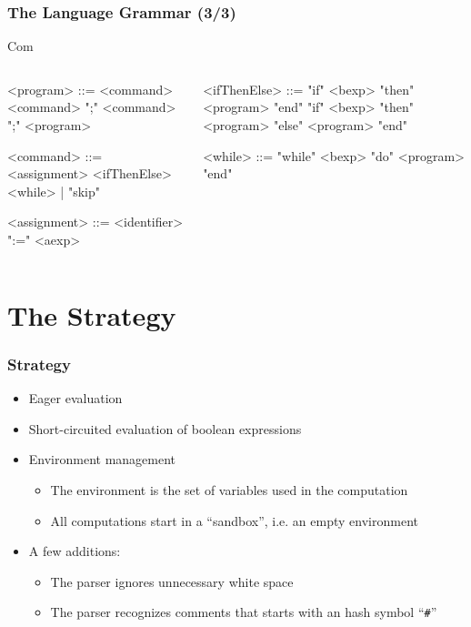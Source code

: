 \documentclass{beamer}
\begin{document}
\begin{frame}[fragile]
\footnotesize
\frametitle{The Language Grammar (3/3)}
\begin{block}{Com}
\begin{columns}
\begin{grammar}
	<program> ::= <command>
	\alt <command> ";"
	\alt <command> ";" <program>

	<command> ::= <assignment>
	\alt <ifThenElse>
	\alt <while> | "skip"

	<assignment> ::= <identifier> ":=" <aexp>

\end{grammar}
\begin{grammar}
	<ifThenElse> ::= "if" <bexp> "then" <program> "end"
	\alt "if" <bexp> "then" <program> "else" <program> "end"

	<while> ::= "while" <bexp> "do" <program> "end"
\end{grammar}
\end{columns}
\end{block}
\end{frame}

\section{The Strategy}
\begin{frame}
\frametitle{Strategy}
\begin{itemize}
	\item Eager evaluation
	\item Short-circuited evaluation of boolean expressions
	\item Environment management
		\begin{itemize}
			\item The environment is the set of variables used in the
				computation
			\item All computations start in a ``sandbox'', i.e. an empty
				environment
		\end{itemize}
	\item A few additions:
		\begin{itemize}
			\item The parser ignores unnecessary white space
			\item The parser recognizes comments that starts with an hash
				symbol ``\texttt{\#}''
		\end{itemize}
\end{itemize}
\end{frame}
\end{document}
